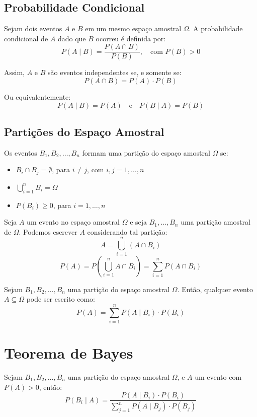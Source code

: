 \documentclass{article}
\begin{document}
\subsection{Probabilidade Condicional}

Sejam dois eventos $A$ e $B$ em um mesmo espaço amostral $\Omega$.  
A probabilidade condicional de $A$ dado que $B$ ocorreu é definida por:
    $$
    P(A \mid B) = \frac{P(A \cap B)}{P(B)}, \quad \text{com } P(B) > 0
    $$

Assim, $A$ e $B$ são eventos independentes se, e somente se:
    $$
    P(A \cap B) = P(A) \cdot P(B)
    $$

Ou equivalentemente:
    $$
    P(A \mid B) = P(A) \quad \text{e} \quad P(B \mid A) = P(B)
    $$

\subsection{Partições do Espaço Amostral}
Os eventos $B_1, B_2, \dots, B_n$ formam uma partição do espaço amostral $\Omega$ se:

\begin{itemize}
    \item $B_i \cap B_j = \emptyset$, para $i \neq j$, com $i, j = 1, \dots, n$
    \item $\bigcup_{i=1}^n B_i = \Omega$
    \item $P(B_i) \geq 0$, para $i = 1, \dots, n$
\end{itemize}

Seja $A$ um evento no espaço amostral $\Omega$ e seja $B_1, \dots, B_n$ uma partição amostral de $\Omega$. Podemos escrever $A$ considerando tal partição:
    $$
    A = \bigcup_{i=1}^n (A \cap B_i)
    $$
    $$
    P(A) = P\left( \bigcup_{i=1}^n A \cap B_i \right) = \sum_{i=1}^n P(A \cap B_i)
    $$

Sejam $B_1, B_2, \dots, B_n$ uma partição do espaço amostral $\Omega$. Então, qualquer evento $A \subseteq \Omega$ pode ser escrito como:
    $$
    P(A) = \sum_{i=1}^n P(A \mid B_i) \cdot P(B_i)
    $$

\section{Teorema de Bayes}
Sejam $B_1, B_2, \dots, B_n$ uma partição do espaço amostral $\Omega$, e $A$ um evento com $P(A) > 0$, então:
    $$
    P(B_i \mid A) = \frac{P(A \mid B_i) \cdot P(B_i)}{\sum_{j=1}^n P(A \mid B_j) \cdot P(B_j)}
    $$
\end{document}
